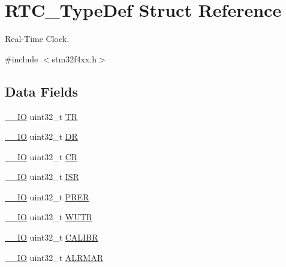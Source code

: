 \hypertarget{struct_r_t_c___type_def}{}\section{R\+T\+C\+\_\+\+Type\+Def Struct Reference}
\label{struct_r_t_c___type_def}


Real-\/\+Time Clock.  




{\ttfamily \#include $<$stm32f4xx.\+h$>$}

\subsection*{Data Fields}
\begin{DoxyCompactItemize}
\item 
\hyperlink{group___c_m_s_i_s__core__definitions_gaec43007d9998a0a0e01faede4133d6be}{\+\_\+\+\_\+\+IO} uint32\+\_\+t \hyperlink{struct_r_t_c___type_def_a63d179b7a36a715dce7203858d3be132}{TR}
\item 
\hyperlink{group___c_m_s_i_s__core__definitions_gaec43007d9998a0a0e01faede4133d6be}{\+\_\+\+\_\+\+IO} uint32\+\_\+t \hyperlink{struct_r_t_c___type_def_a3df0d8dfcd1ec958659ffe21eb64fa94}{DR}
\item 
\hyperlink{group___c_m_s_i_s__core__definitions_gaec43007d9998a0a0e01faede4133d6be}{\+\_\+\+\_\+\+IO} uint32\+\_\+t \hyperlink{struct_r_t_c___type_def_ab40c89c59391aaa9d9a8ec011dd0907a}{CR}
\item 
\hyperlink{group___c_m_s_i_s__core__definitions_gaec43007d9998a0a0e01faede4133d6be}{\+\_\+\+\_\+\+IO} uint32\+\_\+t \hyperlink{struct_r_t_c___type_def_ab3c49a96815fcbee63d95e1e74f20e75}{I\+SR}
\item 
\hyperlink{group___c_m_s_i_s__core__definitions_gaec43007d9998a0a0e01faede4133d6be}{\+\_\+\+\_\+\+IO} uint32\+\_\+t \hyperlink{struct_r_t_c___type_def_ac9b4c6c5b29f3461ce3f875eea69f35b}{P\+R\+ER}
\item 
\hyperlink{group___c_m_s_i_s__core__definitions_gaec43007d9998a0a0e01faede4133d6be}{\+\_\+\+\_\+\+IO} uint32\+\_\+t \hyperlink{struct_r_t_c___type_def_ac5b3c8be61045a304d3076d4714d29f2}{W\+U\+TR}
\item 
\hyperlink{group___c_m_s_i_s__core__definitions_gaec43007d9998a0a0e01faede4133d6be}{\+\_\+\+\_\+\+IO} uint32\+\_\+t \hyperlink{struct_r_t_c___type_def_ab97f3e9584dda705dc10a5f4c5f6e636}{C\+A\+L\+I\+BR}
\item 
\hyperlink{group___c_m_s_i_s__core__definitions_gaec43007d9998a0a0e01faede4133d6be}{\+\_\+\+\_\+\+IO} uint32\+\_\+t \hyperlink{struct_r_t_c___type_def_ac005b1a5bc52634d5a34578cc9d2c3f6}{A\+L\+R\+M\+AR}

\end{DoxyCompactItemize}
